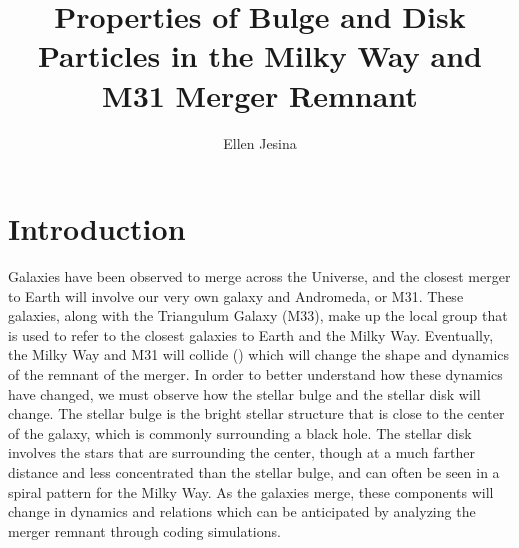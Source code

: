 \documentclass[twocolumn]{aastex631}
\begin{document}
\title{Properties of Bulge and Disk Particles in the Milky Way and M31 Merger Remnant}

\author{Ellen Jesina}


\received{\today}

\section{Introduction} \label{sec:intro}

Galaxies have been observed to merge across the Universe, and the closest merger to Earth will involve our very own galaxy and Andromeda, or M31. These galaxies, along with the Triangulum Galaxy (M33), make up the local group that is used to refer to the closest galaxies to Earth and the Milky Way. Eventually, the Milky Way and M31 will collide (\cite{Cox_2008}) which will change the shape and dynamics of the remnant of the merger. In order to better understand how these dynamics have changed, we must observe how the stellar bulge and the stellar disk will change. The stellar bulge is the bright stellar structure that is close to the center of the galaxy, which is commonly surrounding a black hole. The stellar disk involves the stars that are surrounding the center, though at a much farther distance and less concentrated than the stellar bulge, and can often be seen in a spiral pattern for the Milky Way. As the galaxies merge, these components will change in dynamics and relations which can be anticipated by analyzing the merger remnant through coding simulations. 
\end{document}
